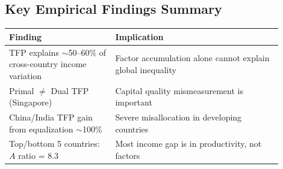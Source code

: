 \documentclass[a4paper,11pt]{article}
\begin{document}
\subsection*{Key Empirical Findings Summary}
\begin{center}
\begin{tabular}{p{0.35\linewidth}p{0.55\linewidth}}
\toprule
\textbf{Finding} & \textbf{Implication} \\
\midrule
TFP explains $\sim$50--60\% of cross-country income variation & Factor accumulation alone cannot explain global inequality \\
Primal $\neq$ Dual TFP (Singapore) & Capital quality mismeasurement is important \\
China/India TFP gain from equalization $\sim$100\% & Severe misallocation in developing countries \\
Top/bottom 5 countries: $A$ ratio = 8.3 & Most income gap is in productivity, not factors \\
\bottomrule
\end{tabular}
\end{center}
\end{document}
